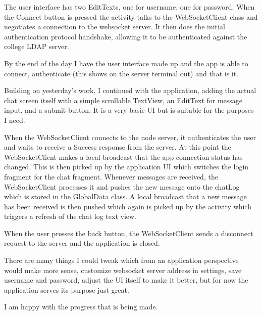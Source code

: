\documentclass[idxtotoc,hyperref,openany]{labbook} %
\begin{document}
 The user interface has two EditTexts, one for username, one for password.  When the Connect button is pressed the activity talks to the WebSocketClient class and negotiates a connection to the websocket server.  It then does the initial authentication protocol handshake, allowing it to be authenticated against the college LDAP server.

 By the end of the day I have the user interface made up and the app is able to connect, authenticate (this shows on the server terminal out) and that is it.



 Building on yesterday's work, I continued with the application, adding the actual chat screen itself with a simple scrollable TextView, an EditText for message input, and a submit button.  It is a very basic UI but is suitable for the purposes I need.

 When the WebSocketClient connects to the node server, it authenticates the user and waits to receive a Success response from the server.  At this point the WebSocketClient makes a local broadcast that the app connection status has changed.  This is then picked up by the application UI which switches the login fragment for the chat fragment.  Whenever messages are received, the WebSocketClient processes it and pushes the new message onto the chatLog which is stored in the GlobalData class.  A local broadcast that a new message has been received is then pushed which again is picked up by the activity which triggers a refresh of the chat log text view.

 When the user presses the back button, the WebSocketClient sends a disconnect request to the server and the application is closed.

 There are many things I could tweak which from an application perspective would make more sense, customize websocket server address in settings, save username and password, adjust the UI itself to make it better, but for now the application serves its purpose just great.

 I am happy with the progress that is being made.


\labday{} %
\end{document}
